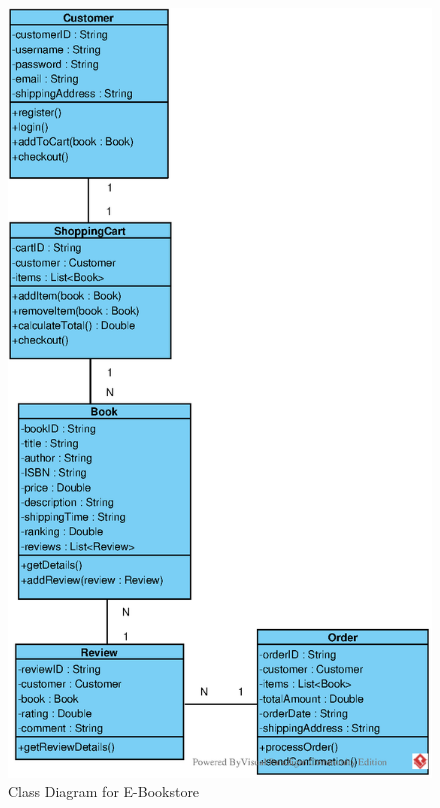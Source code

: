 \vspace{1em} %
\begin{figure}[H]
    \centering
    \includegraphics[width=\textwidth]{images/EPS/q6-part2.eps}
    \caption{Class Diagram for E-Bookstore}
    \label{fig:q6-part2}
\end{figure}

